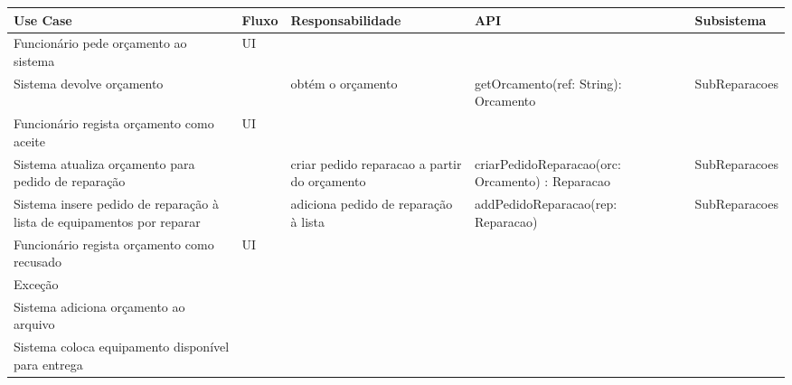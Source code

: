 \documentclass[../relatorio.tex]{subfiles}
\begin{document}
\begin{landscape}
    \begin{table}[!h]
        \centering
        \begin{tabular}{|p{5cm}|p{1cm}|p{4cm}|p{6cm}|p{3cm}|}
            \hline
            \rowcolor{gray!20!white}
            Use Case & Fluxo                                            & Responsabilidade & API & Subsistema \\
            \hline
            \rowcolor{yellow}
            Funcionário pede orçamento ao sistema
                     & UI
                     & 
                     & 
                     & 
            \\
            \hline
            Sistema devolve orçamento
                     & 
                     & obtém o orçamento
                     & getOrcamento(ref: String): Orcamento
                     & SubReparacoes
            \\
            \hline
            \rowcolor{yellow}
            Funcionário regista orçamento como aceite
                     & UI
                     & 
                     & 
                     & 
            \\
            \hline
            Sistema atualiza orçamento para pedido de reparação
                     & 
                     & criar pedido reparacao a partir do orçamento
                     & criarPedidoReparacao(orc: Orcamento) : Reparacao
                     & SubReparacoes
            \\
            \hline
            Sistema insere pedido de reparação à lista de equipamentos por reparar
                     & 
                     & adiciona pedido de reparação à lista
                     & addPedidoReparacao(rep: Reparacao)
                     & SubReparacoes
            \\
            \hline
            \rowcolor{yellow}
            Funcionário regista orçamento como recusado
                     & UI
                     & 
                     & 
                     & 
            \\
            \hline
            \rowcolor{red!30}
            Exceção  &                                                  &                  &     &            \\
            \hline
            Sistema adiciona orçamento ao arquivo
                     & 
                     & 
                     & 
                     & 
            \\
            \hline
            Sistema coloca equipamento disponível para entrega
                     & 
                     & 
                     & 
                     & 
            \\
            \hline
        \end{tabular}
    \end{table}
\end{landscape}
\end{document}
